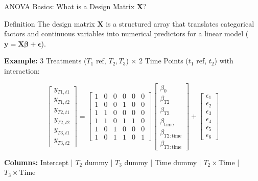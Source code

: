 \documentclass{beamer}
\begin{document}
\begin{frame}[fragile]{ANOVA Basics: What is a Design Matrix $\mathbf{X}$?}

\begin{block}{Definition}
The design matrix $\mathbf{X}$ is a structured array that translates categorical factors and continuous variables into numerical predictors for a linear model ($\mathbf{y} = \mathbf{X}\boldsymbol{\beta} + \boldsymbol{\epsilon}$).
\end{block}

\vspace{0.3em}
\small
\textbf{Example:} 3 Treatments ($T_1$ ref, $T_2, T_3$) $\times$ 2 Time Points ($t_1$ ref, $t_2$) with interaction:

\[
\begin{bmatrix}
y_{T1, t1} \\ y_{T1, t2} \\ y_{T2, t1} \\ y_{T2, t2} \\ y_{T3, t1} \\ y_{T3, t2}
\end{bmatrix}
=
\begin{bmatrix}
1 & 0 & 0 & 0 & 0 & 0 \\
1 & 0 & 0 & 1 & 0 & 0 \\
1 & 1 & 0 & 0 & 0 & 0 \\
1 & 1 & 0 & 1 & 1 & 0 \\
1 & 0 & 1 & 0 & 0 & 0 \\
1 & 0 & 1 & 1 & 0 & 1
\end{bmatrix}
\begin{bmatrix}
\beta_0 \\ \beta_{T2} \\ \beta_{T3} \\ \beta_{\text{time}} \\ \beta_{T2:\text{time}} \\ \beta_{T3:\text{time}}
\end{bmatrix}
+
\begin{bmatrix}
\epsilon_1 \\ \epsilon_2 \\ \epsilon_3 \\ \epsilon_4 \\ \epsilon_5 \\ \epsilon_6
\end{bmatrix}
\]

\footnotesize
\textbf{Columns:} Intercept | $T_2$ dummy | $T_3$ dummy | Time dummy | $T_2 \times \text{Time}$ | $T_3 \times \text{Time}$
\end{frame}
\end{document}
